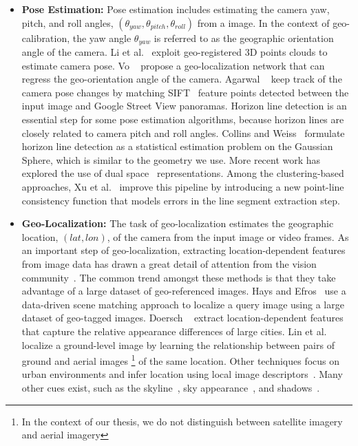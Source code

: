 \begin{itemize}[noitemsep]

\item \textbf{Pose Estimation:}
Pose estimation includes estimating the camera yaw, pitch, and roll
angles, $(\theta_{yaw}, \theta_{pitch}, \theta_{roll})$ from a
image. In the context of geo-calibration, the yaw angle
$\theta_{yaw}$ is referred to as the geographic orientation angle of
the camera.
%
Li et al.~\cite{li2012worldwide} exploit geo-registered 3D points
clouds to estimate camera pose.
Vo \etal~\cite{vo2016localizing} propose a geo-localization network
that can regress the geo-orientation angle of the camera.
Agarwal \etal~\cite{agarwal2015metric} keep track of the camera pose
changes by matching SIFT~\cite{lowe1999object} feature points detected
between the input image and Google Street View panoramas.
%
Horizon line detection is an essential step for some pose
estimation algorithms, because horizon lines are closely related to
camera pitch and roll angles.
Collins and Weiss~\cite{unitsphere1990} formulate horizon line
detection as a statistical estimation problem on the Gaussian Sphere,
which is similar to the geometry we use.  More recent work has
explored the use of dual space~\cite{alignment2014,dualspace2013}
representations. Among the clustering-based approaches, Xu et
al.~\cite{kitware2013} improve this pipeline by introducing a new
point-line consistency function that models errors in the line segment
extraction step.
\newline

\item \textbf{Geo-Localization:}
The task of geo-localization estimates the geographic location, $(lat,
lon)$, of the camera from the input image or video frames.
%
As an important step of geo-localization, extracting
location-dependent features from image data has drawn a great detail
of attention from the vision community~\cite{jacobs07geolocate,
jacobs11geolocate, jacobs08geoorient}. The common trend amongst these
methods is that they take advantage of a large dataset of
geo-referenced images. Hays and Efros~\cite{hays2008im2gps} use a
data-driven scene matching approach to localize a query image using a
large dataset of geo-tagged images.  Doersch
\etal~\cite{doersch2012what} extract location-dependent features that
capture the relative appearance differences of large cities.  Lin et
al.~\cite{lin2013cross} localize a ground-level image by learning the
relationship between pairs of ground and aerial images \footnote{In
the context of our thesis, we do not distinguish between satellite
imagery and aerial imagery} of the same location. Other techniques
focus on urban environments and infer location using local image
descriptors~\cite{schindler2008detecting,snavely2006photo}.  Many
other cues exist, such as the
skyline~\cite{baatz2012large,ramalingam2009geolocalization}, sky
appearance~\cite{lalonde2010sun,workman2014rainbow}, and
shadows~\cite{junejo2008estimating,wu2010geo}.
\newline


\end{itemize}

